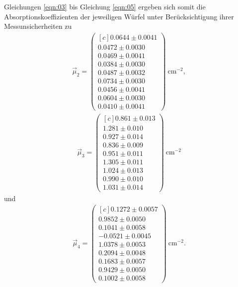 Gleichungen \ref{eqn:03} bis Gleichung \ref{eqn:05} ergeben sich somit die
Absorptionskoeffizienten der jeweiligen Würfel unter Berücksichtigung ihrer
Messunsicherheiten zu
\begin{align}
  \vec{\mu}_2 = \begin{pmatrix*}[c]
                0.0644 \pm 0.0041 \\
                0.0472 \pm 0.0030 \\
                0.0469 \pm 0.0041 \\
                0.0384 \pm 0.0030 \\
                0.0487 \pm 0.0032 \\
                0.0734 \pm 0.0030 \\
                0.0456 \pm 0.0041 \\
                0.0604 \pm 0.0030 \\
                0.0410 \pm 0.0041
                \end{pmatrix*}\: \si{\centi\metre^{-2}},
\end{align}
\begin{align}
  \vec{\mu}_3 = \begin{pmatrix*}[c]
                0.861 \pm 0.013  \\
                1.281 \pm 0.010  \\
                0.927 \pm 0.014  \\
                0.836 \pm 0.009  \\
                0.951 \pm 0.011  \\
                1.305 \pm 0.011 \\
                1.024 \pm 0.013  \\
                0.990 \pm 0.010  \\
                1.031 \pm 0.014
                \end{pmatrix*}\: \si{\centi\metre^{-2}}
\end{align}
\noindent und
\begin{align}
  \vec{\mu}_4 = \begin{pmatrix*}[c]
                 0.1272   \pm 0.0057  \\
                 0.9852   \pm 0.0050  \\
                 0.1041   \pm 0.0058  \\
                -0.0521   \pm 0.0045  \\
                 1.0378   \pm 0.0053  \\
                 0.2094   \pm 0.0048   \\
                 0.1683   \pm 0.0057  \\
                 0.9429   \pm 0.0050  \\
                 0.1002   \pm 0.0058
                \end{pmatrix*}\: \si{\centi\metre^{-2}}.
\end{align}
